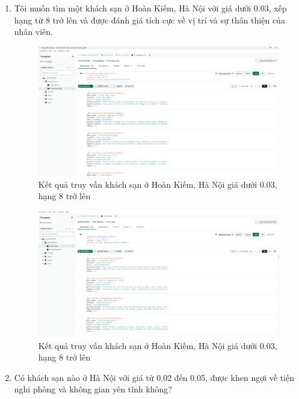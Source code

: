 \begin{enumerate} 
    \item Tôi muốn tìm một khách sạn ở Hoàn Kiếm, Hà Nội với giá dưới 0.03, xếp hạng từ 8 trở lên và được đánh giá tích cực về vị trí và sự thân thiện của nhân viên.

    \begin{figure}[H]
        \centering
        \includegraphics[width=0.9\linewidth]{Figures/11.4.png}
        \caption{Kết quả truy vấn khách sạn ở Hoàn Kiếm, Hà Nội giá dưới 0.03, hạng 8 trở lên}
    \end{figure}

    \begin{figure}[H]
        \centering
        \includegraphics[width=0.9\linewidth]{Figures/11.5.png}
        \caption{Kết quả truy vấn khách sạn ở Hoàn Kiếm, Hà Nội giá dưới 0.03, hạng 8 trở lên}
    \end{figure}

    \item Có khách sạn nào ở Hà Nội với giá từ 0.02 đến 0.05, được khen ngợi về tiện nghi phòng và không gian yên tĩnh không?


\end{enumerate}

